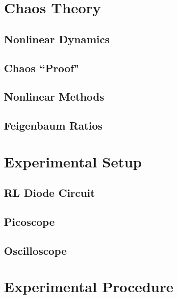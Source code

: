 \documentclass[12pt]{report}
\begin{document}


\chapter{Chaos Theory}

\section{Nonlinear Dynamics}
\label{sec: Nonlinear Dynamics}


\section{Chaos ``Proof"}
\label{sec: Chaos ``Proof"}


\section{Nonlinear Methods}
\label{sec: Nonlinear Methods}


\section{Feigenbaum Ratios}
\label{sec: Feigenbaum Ratios}


\chapter{Experimental Setup}

\section{RL Diode Circuit}
\label{sec:RL Diode Circuit}


\section{Picoscope}
\label{sec:Picoscope}


\section{Oscilloscope}
\label{sec:Oscilloscope}


\chapter{Experimental Procedure}

\end{document}
